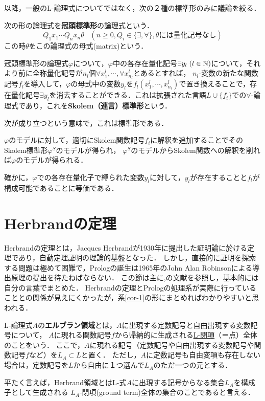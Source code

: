 \documentclass[uplatex,dvipdfmx]{jsarticle}
\begin{document}
以降，一般のL-論理式についてではなく，次の２種の標準形のみに議論を絞る．

\begin{definition}
    次の形の論理式を\textbf{冠頭標準形}の論理式という．
    \[ Q_1x_1\cdots Q_nx_n\theta\;\;\;(n\ge 0,Q_i\in\{\exists,\forall\},\theta には量化記号なし) \]
    この時$\theta$をこの論理式の母式(matrix)という．
\end{definition}

\begin{definition}
    冠頭標準形の論理式$\varphi$について，$\varphi$中の各存在量化記号$\exists y_l\;(l\in\mathbb{N})$について，それより前に全称量化記号が$n_l$個$\forall x_1^l,\cdots,\forall x_{n_l}^l$とあるとすれば，
    $n_l$-変数の新たな関数記号$f_l$を導入して，$\varphi$の母式中の変数$y_l$を$f_l(x^l_1,\cdots,x^l_{n_l})$で置き換えることで，存在量化記号$\exists y_l$を消去することができる．これは拡張された言語$L\cup\{f_i\}$での$\forall$-論理式であり，これを\textbf{Skolem（連言）標準形}という．
\end{definition}
次が成り立つという意味で，これは標準形である．
\begin{proposition}\label{prop-1}
    $\varphi$のモデルに対して，適切にSkolem関数記号$f_i$に解釈を追加することでそのSkolem標準形$\varphi^S$のモデルが得られ，
    $\varphi^S$のモデルからSkolem関数への解釈を削れば$\varphi$のモデルが得られる．
\end{proposition}
確かに，$\varphi$での各存在量化子で縛られた変数$y_l$に対して，$y_l$が存在することと$f_l$が構成可能であることに等価である．


\section{Herbrandの定理}
Herbrandの定理とは，Jacques Herbrandが1930年に提出した証明論に於ける定理であり\cite{Herbrand}，自動定理証明の理論的基盤となった．
しかし，直接的に証明を探索する問題は極めて困難で，Prologの誕生は1965年のJohn Alan Robinsonによる導出原理の提出を待たねばならない．
この節は主に\cite{新井敏康},\cite{エルブランの定理}の文献を参照し，基本的には自分の言葉でまとめた．
Herbrandの定理とPrologの処理系が実際に行っていることとの関係が見えにくかったが，系\ref{cor-1}の形にまとめればわかりやすいと思われる．

\begin{definition}
    L-論理式$A$の\textbf{エルブラン領域}とは，$A$に出現する定数記号と自由出現する変数記号について，
    $A$に現れる関数記号$f$から帰納的に生成される\underline{L-閉項}（＝点）全体のことをいう．
    ここで，$A$に現れる記号（定数記号や自由出現する変数記号や関数記号$f$など）を$L_A\subset L$と置く．
    ただし，$A$に定数記号も自由変項も存在しない場合は，定数記号を$L$から自由に１つ選んで$L_A$のただ一つの元とする．
\end{definition}
\begin{remark}
    平たく言えば，Herbrand領域とはL-式$A$に出現する記号からなる集合$L_A$を構成子として生成される
    $L_A$-閉項(ground term)全体の集合のことであると言える．
\end{remark}
\end{document}
